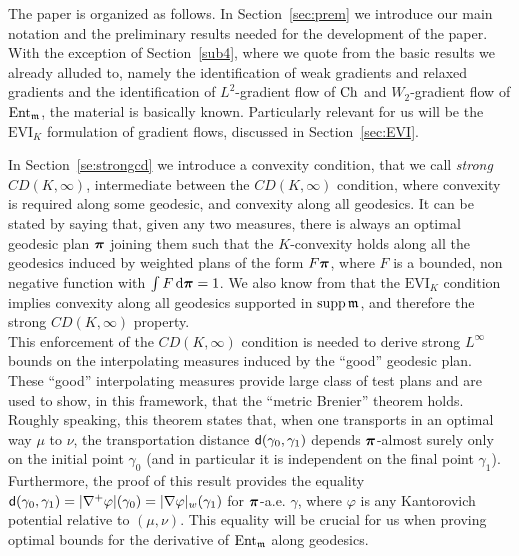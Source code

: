 \documentclass[reqno,11pt]{article}
\numberwithin{equation}{section}
\newcommand{\C}{\mathbb{C}}
\newcommand{\mm}{{\mbox{\boldmath$m$}}}
\newcommand{\ppi}{{\mbox{\boldmath$\pi$}}}
\newcommand{\sfd}{{\sf d}}
\newcommand{\supp}{\mathop{\rm supp}\nolimits}   %
\renewcommand{\d}{{\mathrm d}}
\newcommand{\EVI}[4]{\mathrm{EVI}_{#4}(#1,{#2}_W,#3)}
\newcommand{\entv}{{\rm Ent}_{\mm}}                    %
\newcommand{\weakgrad}[1]{|\nabla #1|_w}                %
\renewcommand{\C}{{\rm Ch}}
\renewcommand{\EVI}{\ensuremath{\mathrm{EVI}}}
\renewcommand{\mm}{\mathfrak m}
\begin{document}
The paper is organized as follows. In Section~\ref{sec:prem} we
introduce our main notation and the preliminary results needed for
the development of the paper. With the exception of
Section~\ref{sub4}, where we quote from
\cite{Ambrosio-Gigli-Savare11} the basic results we already alluded
to, namely the identification of weak gradients and relaxed
gradients and the identification of $L^2$-gradient flow of $\C$ and
$W_2$-gradient flow of $\entv$, the material is basically known.
Particularly relevant for us will be the $\EVI_K$ formulation of
gradient flows, discussed in Section~\ref{sec:EVI}.

In Section~\ref{se:strongcd} we introduce a convexity condition,
that we call \emph{strong} $CD(K,\infty)$, intermediate between the
$CD(K,\infty)$ condition, where convexity is required along some
geodesic, and convexity along all geodesics. It can be stated by
saying that, given any two measures, there is always an optimal
geodesic plan $\ppi$ joining them such that the $K$-convexity holds
along all the geodesics induced by weighted plans of the form
$F\ppi$, where $F$ is a bounded, non negative function with $\int
F\,\d\ppi=1$. We also know from \cite{Daneri-Savare08} that the
$\EVI_K$ condition implies convexity along all geodesics supported
in $\supp\mm$, and therefore the strong $CD(K,\infty)$ property.\\
This enforcement of the $CD(K,\infty)$ condition is needed to derive
strong $L^\infty$ bounds on the interpolating measures induced by
the ``good'' geodesic plan. These ``good'' interpolating measures
provide large class of test plans and are used to show, in this
framework, that the ``metric Brenier'' theorem
\cite[Theorem~10.3]{Ambrosio-Gigli-Savare11} holds. Roughly
speaking, this theorem states that, when one transports in an
optimal way $\mu$ to $\nu$, the transportation distance
$\sfd(\gamma_0,\gamma_1)$ depends $\ppi$-almost surely only on the
initial point $\gamma_0$ (and in particular it is independent on the
final point $\gamma_1$). Furthermore, the proof of this result
provides the equality
$\sfd(\gamma_0,\gamma_1)=|\nabla^+\varphi|(\gamma_0)=\weakgrad{\varphi}(\gamma_1)$
for $\ppi$-a.e. $\gamma$, where $\varphi$ is any Kantorovich
potential relative to $(\mu,\nu)$. This equality will be crucial for
us when proving optimal bounds for the derivative of $\entv$ along
geodesics.
\end{document}

